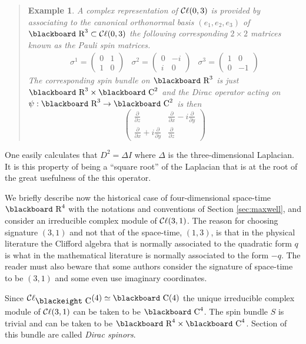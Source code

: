 \documentclass[12pt,titlepage]{article}
\def\bbf#1{\hbox{\blackboard #1}}
\def\bbfeight#1{\hbox{\blackeight #1}}
\def\lC{\bbf C}
\def\lCe{\bbfeight C}
\def\lR{\bbf R}
\def\cC{{\cal C}}
\def\Cl{{\cC\ell}}
\newtheorem{eg}{Example}
\newenvironment{example}{\begin{quote}\begin{eg}}{\end{eg}\end{quote}}
\begin{document}
\begin{example}%
A complex representation of \(\Cl(0,3)\) is provided by associating to the
canonical  
orthonormal basis \((e_1, e_2, e_3)\) of \(\lR^3\subset \Cl(0,3)\) 
the following corresponding \(2\times 2\) matrices 
known as the 
{\em Pauli spin matrices}.
%
\[
\begin{array}{ccc}%
\sigma^1 = \left(\begin{array}{cc}0 & 1 \\ 1 & 0\end{array}\right) &
\sigma^2=\left(\begin{array}{cc}0 & -i \\ i & 0\end{array}\right) &
\sigma^3=\left(\begin{array}{cc}1 & 0 \\ 0 & -1\end{array}\right)
\end{array}
\]
The corresponding spin bundle on \(\lR^3\) is just  \(\lR^3\times
\lC^2\) and the Dirac operator acting on \(\psi:\lR^3\to \lC^2\) is then
\[
\left(\begin{array}{cc}%
\frac{\partial}{\partial z} & \frac{\partial}{\partial x}-
i\frac{\partial}{\partial y} \\
\frac{\partial}{\partial x} + i\frac{\partial}{\partial y} &
\frac{\partial}{\partial z}
\end{array}\right)
\]
\end{example}%

One easily calculates that \(D^2 = \Delta I\) where \(\Delta\) is the
three-dimensional Laplacian. It is this property of being a ``square
root'' of the Laplacian that is at the root of the great usefulness of
the this operator. 


We briefly describe now  the historical case of four-dimensional
space-time \(\lR^4\) with the notations and conventions of Section
\ref{sec:maxwell}, and consider an irreducible complex module of 
\(\Cl(3,1)\). The reason for choosing signature \((3,1)\) and not 
that of the space-time,  \((1,3)\), is that in the 
physical literature the Clifford
algebra that is normally associated to the quadratic form \(q\) is what
in the mathematical literature is normally associated to the form 
\(-q\). The reader must also beware that some authors consider the 
signature
of space-time to be \((3,1)\) and some even use imaginary
coordinates. 

Since \(\Cl_{\lCe}(4) \simeq \lC(4)\) the unique 
irreducible complex module of
\(\Cl(3,1)\) can be taken to be \(\lC^4\). The spin bundle \(S\)
 is trivial
and can be taken to be \(\lR^4\times \lC^4\). Section of this bundle are
called {\em Dirac spinors\/}. 
%
\end{document}
